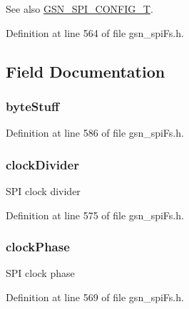 \begin{DoxySeeAlso}{See also}
\hyperlink{a00655_ga582e2b85ccb404b546fbe5a27f2113cb}{GSN\_\-SPI\_\-CONFIG\_\-T}. 
\end{DoxySeeAlso}


Definition at line 564 of file gsn\_\-spiFs.h.



\subsection{Field Documentation}
\hypertarget{a00233_a7607005ffbebdca79ab3c4d558d0e442}{
\subsubsection[{byteStuff}]{ {\bf byteStuff}}}
\label{a00233_a7607005ffbebdca79ab3c4d558d0e442}


Definition at line 586 of file gsn\_\-spiFs.h.

\hypertarget{a00233_ae7807face22c73f3541066336176a60d}{
\subsubsection[{clockDivider}]{ {\bf clockDivider}}}
\label{a00233_ae7807face22c73f3541066336176a60d}
SPI clock divider 

Definition at line 575 of file gsn\_\-spiFs.h.

\hypertarget{a00233_ab8f87412e17e4d7b63efa4741fa0a00f}{
\subsubsection[{clockPhase}]{ {\bf clockPhase}}}
\label{a00233_ab8f87412e17e4d7b63efa4741fa0a00f}
SPI clock phase 

Definition at line 569 of file gsn\_\-spiFs.h.

